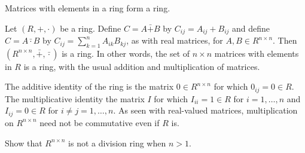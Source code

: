 
Matrices with elements in a ring form a ring.

Let $(R, +, \cdot )$ be a ring.
Define $C = A \bar{+} B$ by $C_{ij} = A_{ij} + B_{ij}$ and define $C = A \bar{\cdot } B$ by $C_{ij} = \sum_{k = 1}^{n} A_{ik}B_{kj}$, as with real matrices, for $A, B \in R^{n \times n}$.
Then $(R^{n \times n}, \bar{+}, \bar{\cdot })$ is a ring.
In other words, the set of $n \times n$ matrices with elements in $R$ is a ring, with the usual addition and multiplication of matrices.

The additive identity of the ring is the matrix $0 \in R^{n \times n}$ for which $0_{ij} = 0 \in R$.
The multiplicative identity the matrix $I$ for which $I_{ii} = 1 \in R$ for $i = 1, \dots , n$ and $I_{ij} = 0 \in R$ for $i \neq j = 1, \dots , n$.
As seen with real-valued matrices, multiplication on $R^{n \times n}$ need not be commutative even if $R$ is.

\begin{exercise}
Show that $R^{n \times n}$ is not a division ring when $n > 1$.
\end{exercise}

\blankpage
